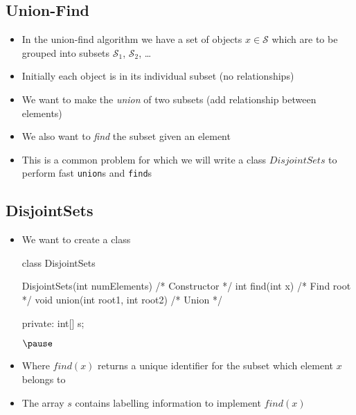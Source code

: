 \Outline %

\begin{slide}
\section{Union-Find}

\begin{PauseHighLight}
  \begin{itemize}
  \item In the union-find algorithm we have a set of objects $x \in 
    \mathcal{S}$ which are to be grouped into subsets $\mathcal{S}_1$,
    $\mathcal{S}_2$, \ldots\pause
  \item Initially each object is in its individual subset (no relationships)\pause
  \item We want to make the \emph{union} of two subsets (add
    relationship between elements)\pause
  \item We also want to \emph{find} the subset given an element\pause
  \item This is a common problem for which we will write a class
  \jl$DisjointSets$ to perform fast \texttt{union}s and \texttt{find}s\pause
  \end{itemize}
\end{PauseHighLight}

\end{slide}


\begin{slide}
\section[-1]{DisjointSets}

\begin{PauseHighLight}
  \begin{itemize}
  \item We want to create a class
    \begin{java}
class DisjointSets
{
    DisjointSets(int numElements) {/* Constructor */}
    int find(int x) {/* Find root */}
    void union(int root1, int root2) {/* Union */}

    private:
      int[] s;
}$\pause$
    \end{java}
  \item Where \jl$find(x)$ returns a unique identifier for the subset
    which element \jl$x$ belongs to\pause
  \item The array \jl$s$ contains labelling information to implement
    \jl$find(x)$\pause
  \end{itemize}
\end{PauseHighLight}

\end{slide}

